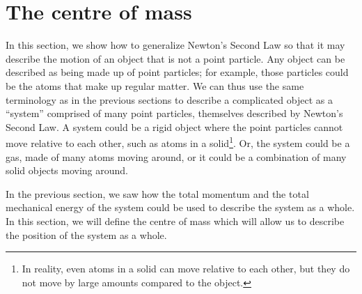 \section{The centre of mass}
In this section, we show how to generalize Newton's Second Law so that it may describe the motion of an object that is not a point particle. Any object can be described as being made up of point particles; for example, those particles could be the atoms that make up regular matter. We can thus use the same terminology as in the previous sections to describe a complicated object as a ``system'' comprised of many point particles, themselves described by Newton's Second Law. A system could be a rigid object where the point particles cannot move relative to each other, such as atoms in a solid\footnote{In reality, even atoms in a solid can move relative to each other, but they do not move by large amounts compared to the object.}. Or, the system could be a gas, made of many atoms moving around, or it could be a combination of many solid objects moving around. 

In the previous section, we saw how the total momentum and the total mechanical energy of the system could be used to describe the system as a whole. In this section, we will define the centre of mass which will allow us to describe the position of the system as a whole.

